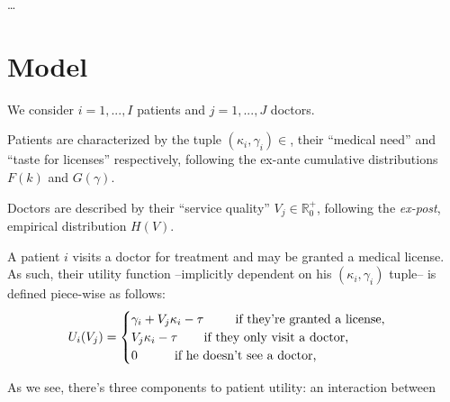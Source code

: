 \documentclass{article}
\begin{document}
\dots

\section{Model}

We consider $i = 1, ..., I$ patients and $j = 1, ..., J$ doctors.

Patients are characterized by the tuple $(\kappa_i,\gamma_i) \in $, their ``medical need'' and ``taste for licenses'' respectively, following the ex-ante cumulative distributions $F(k)$ and $G(\gamma)$.

Doctors are described by their ``service quality'' $V_j \in \mathbb{R}_0^+$, following the \textit{ex-post}, empirical distribution $H(V)$.

A patient $i$ visits a doctor for treatment and may be granted a medical license. As such, their utility function --implicitly dependent on his $(\kappa_i,\gamma_i)$ tuple-- is defined piece-wise as follows:
    \[
U_i(V_j) =\begin{cases}
\gamma_i + V_j \kappa_i - \tau \text{  \hspace{0.65cm} if they're granted a license,} \\
V_j \kappa_i - \tau \text{  \hspace{0.5cm} if they only visit a doctor,} \\
0 \text{  \hspace{0.8cm} if he doesn't see a doctor,}
\end{cases}
\]

As we see, there's three components to patient utility: an interaction between 


\newpage
	 

\end{document}
